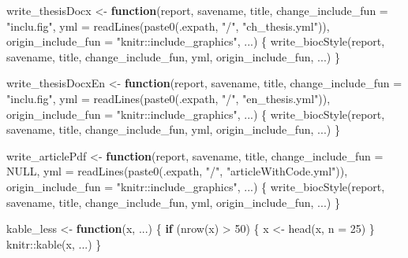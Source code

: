 \documentclass[
]{article}
\newenvironment{Shaded}{\begin{snugshade}}{\end{snugshade}}
\newcommand{\AttributeTok}[1]{\textcolor[rgb]{0.77,0.63,0.00}{#1}}
\newcommand{\ConstantTok}[1]{\textcolor[rgb]{0.00,0.00,0.00}{#1}}
\newcommand{\ControlFlowTok}[1]{\textcolor[rgb]{0.13,0.29,0.53}{\textbf{#1}}}
\newcommand{\DecValTok}[1]{\textcolor[rgb]{0.00,0.00,0.81}{#1}}
\newcommand{\FunctionTok}[1]{\textcolor[rgb]{0.00,0.00,0.00}{#1}}
\newcommand{\NormalTok}[1]{#1}
\newcommand{\OtherTok}[1]{\textcolor[rgb]{0.56,0.35,0.01}{#1}}
\newcommand{\SpecialCharTok}[1]{\textcolor[rgb]{0.00,0.00,0.00}{#1}}
\newcommand{\StringTok}[1]{\textcolor[rgb]{0.31,0.60,0.02}{#1}}
\begin{document}
\begin{Shaded}
\begin{Highlighting}[]
\NormalTok{write\_thesisDocx }\OtherTok{\textless{}{-}} \ControlFlowTok{function}\NormalTok{(report, savename, title,}
  \AttributeTok{change\_include\_fun =} \StringTok{"inclu.fig"}\NormalTok{,}
  \AttributeTok{yml =} \FunctionTok{readLines}\NormalTok{(}\FunctionTok{paste0}\NormalTok{(.expath, }\StringTok{"/"}\NormalTok{, }\StringTok{"ch\_thesis.yml"}\NormalTok{)),}
  \AttributeTok{origin\_include\_fun =} \StringTok{"knitr::include\_graphics"}\NormalTok{, ...)}
\NormalTok{\{}
  \FunctionTok{write\_biocStyle}\NormalTok{(report, savename, title, change\_include\_fun, yml, origin\_include\_fun, ...)}
\NormalTok{\}}

\NormalTok{write\_thesisDocxEn }\OtherTok{\textless{}{-}} \ControlFlowTok{function}\NormalTok{(report, savename, title,}
  \AttributeTok{change\_include\_fun =} \StringTok{"inclu.fig"}\NormalTok{,}
  \AttributeTok{yml =} \FunctionTok{readLines}\NormalTok{(}\FunctionTok{paste0}\NormalTok{(.expath, }\StringTok{"/"}\NormalTok{, }\StringTok{"en\_thesis.yml"}\NormalTok{)),}
  \AttributeTok{origin\_include\_fun =} \StringTok{"knitr::include\_graphics"}\NormalTok{, ...)}
\NormalTok{\{}
  \FunctionTok{write\_biocStyle}\NormalTok{(report, savename, title, change\_include\_fun, yml, origin\_include\_fun, ...)}
\NormalTok{\}}

\NormalTok{write\_articlePdf }\OtherTok{\textless{}{-}} \ControlFlowTok{function}\NormalTok{(report, savename, title,}
  \AttributeTok{change\_include\_fun =} \ConstantTok{NULL}\NormalTok{,}
  \AttributeTok{yml =} \FunctionTok{readLines}\NormalTok{(}\FunctionTok{paste0}\NormalTok{(.expath, }\StringTok{"/"}\NormalTok{, }\StringTok{"articleWithCode.yml"}\NormalTok{)),}
  \AttributeTok{origin\_include\_fun =} \StringTok{"knitr::include\_graphics"}\NormalTok{, ...)}
\NormalTok{\{}
  \FunctionTok{write\_biocStyle}\NormalTok{(report, savename, title, change\_include\_fun, yml, origin\_include\_fun, ...)}
\NormalTok{\}}

\NormalTok{kable\_less }\OtherTok{\textless{}{-}} \ControlFlowTok{function}\NormalTok{(x, ...) \{}
  \ControlFlowTok{if}\NormalTok{ (}\FunctionTok{nrow}\NormalTok{(x) }\SpecialCharTok{\textgreater{}} \DecValTok{50}\NormalTok{) \{}
\NormalTok{    x }\OtherTok{\textless{}{-}} \FunctionTok{head}\NormalTok{(x, }\AttributeTok{n =} \DecValTok{25}\NormalTok{)}
\NormalTok{  \}}
\NormalTok{  knitr}\SpecialCharTok{::}\FunctionTok{kable}\NormalTok{(x, ...)}
\NormalTok{\}}
\end{Highlighting}
\end{Shaded}
\end{document}
